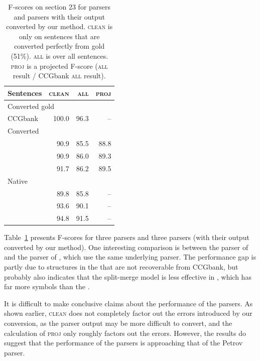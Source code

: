 \begin{table}
\centering
\begin{tabular}{lrr|r}
	\hline
	Sentences & \textsc{clean} & \textsc{all} & \textsc{proj} \\
	\hline
	\hline
		\multicolumn{2}{l}{Converted gold \ccg} & & \\
		CCGbank & \hspace{0mm}100.0 & \hspace{0mm}96.3 & -- \\
	\hline
		\multicolumn{2}{l}{Converted \ccg} & & \\
		\textcite{Clark-Curran:2007} & 90.9 & 85.5 & 88.8 \\
		\textcite{Fowler-Penn:2010} & 90.9 & 86.0 & 89.3 \\
		\textcite{Auli-Lopez:2011} & 91.7 & 86.2 & 89.5 \\
	\hline
		\multicolumn{2}{l}{Native \ptb} & & \\
		\textcite{Klein-Manning:2003} & 89.8 & 85.8 & -- \\
		\textcite{Petrov-Klein:2007} & 93.6 & 90.1 & -- \\
		\textcite{Charniak-Johnson:2005} & 94.8 & 91.5 & -- \\
	\hline
\end{tabular}
\caption{
	\label{tab:full-comp}
	F-scores on section 23 for \ptb parsers and \ccg parsers with their output
	converted by our method.
	\textsc{clean} is only on sentences that are converted perfectly from gold
	\ccg (51\%).
	\textsc{all} is over all sentences.  
	\textsc{proj} is a projected F-score (\textsc{all} result / CCGbank
	\textsc{all} result).
}
\end{table}

Table~\ref{tab:full-comp} presents F-scores for three \ptb parsers and three
\ccg parsers (with their output converted by our method).  One interesting
comparison is between the \ptb parser of \textcite{Petrov-Klein:2007} and the
\ccg parser of \textcite{Fowler-Penn:2010}, which use the same underlying
parser.  The performance gap is partly due to structures in the \ptb that are
not recoverable from CCGbank, but probably also indicates that the split-merge
model is less effective in \ccg, which has far more symbols than the \ptb.

It is difficult to make conclusive claims about the performance of the parsers.
As shown earlier, \textsc{clean} does not completely factor out the errors
introduced by our conversion, as the parser output may be more difficult to
convert, and the calculation of \textsc{proj} only roughly factors out the
errors.  However, the results do suggest that the performance of the \ccg
parsers is approaching that of the Petrov parser.

